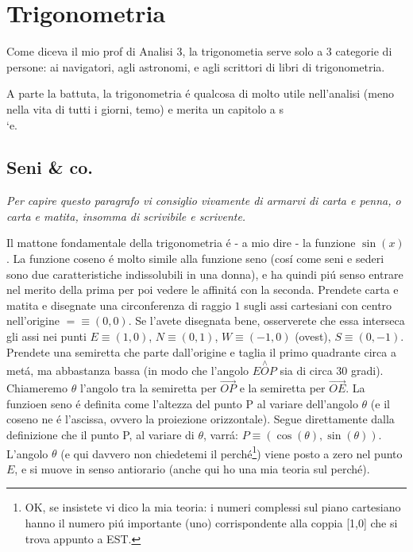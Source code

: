 \label{trigonometria}
\label{seniecoseni}

\chapter{Trigonometria}

Come diceva il mio prof di Analisi 3, la trigonometia serve solo a 3 categorie di persone: ai navigatori, agli astronomi, e agli scrittori di libri di trigonometria.

A parte la battuta, la trigonometria \'e qualcosa di molto utile nell'analisi (meno nella vita di tutti i giorni, temo) e merita un capitolo a s\\`e.

\section{Seni \& co.}

{\em Per capire questo paragrafo vi consiglio vivamente di armarvi di carta e penna, o carta e matita, insomma di scrivibile e scrivente.}

Il mattone fondamentale della trigonometria \'e - a mio dire - la funzione $\sin(x)$. La funzione coseno \'e molto simile alla funzione
seno (cos\'i come seni e sederi sono due caratteristiche indissolubili in una donna), e ha quindi pi\'u senso entrare nel merito della
prima per poi vedere le affinit\'a con la seconda. Prendete carta e matita e disegnate una circonferenza di raggio $1$ sugli assi cartesiani
con centro nell'origine $= \equiv (0,0)$. Se l'avete disegnata bene, osserverete che essa interseca gli assi nei punti $E \equiv (1,0)$, $N \equiv (0,1)$, $W \equiv (-1,0)$
(ovest), $S \equiv (0,-1)$. 
Prendete una semiretta che parte dall'origine e taglia il primo quadrante circa a met\'a, ma abbastanza bassa (in modo che l'angolo $E\stackrel{\wedge}{O}P$ sia di circa 30 gradi). 
Chiameremo $\theta$ l'angolo tra la semiretta per $\overrightarrow{OP}$ e la semiretta per $\overrightarrow{OE}$. La funzioen seno \'e definita
come l'altezza del punto P al variare dell'angolo $\theta$ (e il coseno ne \'e l'ascissa, ovvero la proiezione orizzontale).
Segue direttamente dalla definizione che il punto P, al variare di $\theta$, varr\'a: $P \equiv (\cos(\theta),\sin(\theta))$.
L'angolo $\theta$ (e qui davvero non chiedetemi il perch\'e\footnote{OK, se insistete vi dico la mia teoria: i numeri complessi
	sul piano cartesiano hanno il numero pi\'u importante (uno) corrispondente alla coppia [1,0] che si trova appunto a EST.})
viene posto a zero nel punto $E$, e si muove in senso antiorario (anche qui ho una mia teoria sul perch\'e).

